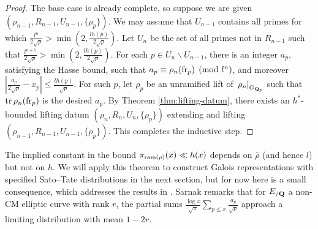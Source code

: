 \begin{proof}
The base case is already complete, so suppose we are given 
$(\rho_{n-1},R_{n-1},U_{n-1},\{\rho_p\})$. We may assume that $U_{n-1}$ 
contains all primes for 
which $\frac{l^n}{2\sqrt p} > \min\left(2, \frac{l h(p)}{2\sqrt p}\right)$. Let 
$U_n$ be the set of all primes not in $R_{n-1}$ such that 
$\frac{l^{n+1}}{2\sqrt p} > \min\left(2, \frac{l h(p)}{2\sqrt p}\right)$. For 
each $p\in U_n\smallsetminus U_{n-1}$, there is an integer $a_p$, satisfying 
the Hasse bound, such that $a_p\equiv \rho_n(\mathrm{fr}_p)\pmod{l^n}$, and moreover 
$\left|\frac{a_p}{2\sqrt p} - x_p\right| \leqslant \frac{l h(p)}{\sqrt p}$. 
For such $p$, let $\rho_p$ be an unramified lift of 
$\left. \rho_n\right|_{G_{\mathbf{Q}_p}}$ such that $\operatorname{tr}\rho_n(\mathrm{fr}_p)$ is the 
desired $a_p$. By Theorem \ref{thm:lifting-datum}, there exists an 
$h^\ast$-bounded lifting datum $(\rho_n,R_n,U_n,\{\rho_p\})$ extending and 
lifting $(\rho_{n-1},R_{n-1},U_{n-1},\{\rho_p\})$. This completes the inductive 
step.  
\end{proof}

The implied constant in the bound $\pi_{\mathrm{ram}(\rho)}(x)\ll h(x)$ depends on 
$\bar\rho$ (and hence $l$) but not on $h$. 
We will apply this theorem to construct Galois representations with specified 
Sato--Tate distributions in the next section, but for now here is a small 
consequence, which addresses the results in \cite{sarnak-2007}. Sarnak remarks 
that for $E_{/\mathbf{Q}}$ a non-CM elliptic curve with rank $r$, the partial sums 
$\frac{\log x}{\sqrt x} \sum_{p\leqslant x} \frac{a_p}{\sqrt p}$ approach a 
limiting distribution with mean $1 - 2 r$. 

